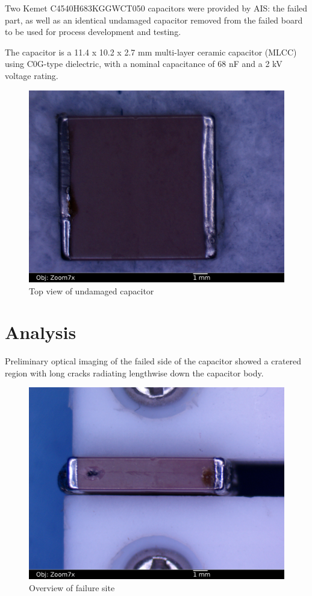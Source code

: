 \documentclass{article}
\begin{document}
Two Kemet C4540H683KGGWCT050 capacitors were provided by AIS: the failed part, as well as an identical undamaged
capacitor removed from the failed board to be used for process development and testing.

The capacitor is a 11.4 x 10.2 x 2.7 mm multi-layer ceramic capacitor (MLCC) using C0G-type dielectric, with a nominal
capacitance of 68 nF and a 2 kV voltage rating.

\begin{figure}[h]
\includegraphics[scale=0.25]{01-goodcap-top_annotated.jpg}
\caption{Top view of undamaged capacitor}
\label{overview}
\end{figure}

\pagebreak
\section{Analysis}

Preliminary optical imaging of the failed side of the capacitor showed a cratered region with long cracks radiating
lengthwise down the capacitor body.

\begin{figure}[h]
\includegraphics[scale=0.25]{02-badcap-side_annotated.jpg}
\caption{Overview of failure site}
\label{fail-overview}
\end{figure}
\end{document}
